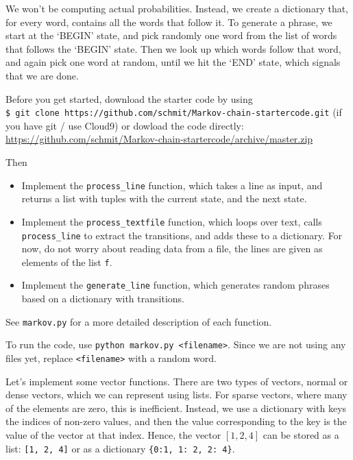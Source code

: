 \begin{questions}
We won't be computing actual probabilities.
Instead, we create a dictionary that,
for every word, contains all the words that follow it.
To generate a phrase, we start at the `BEGIN' state, and pick randomly one word
from the list of words that follows the `BEGIN' state.
Then we look up which words follow that word, and again pick one word at random, until
we hit the `END' state, which signals that we are done.

Before you get started, download the starter code by using\\
\texttt{\$ git clone https://github.com/schmit/Markov-chain-startercode.git} (if you have git / use Cloud9)
    or dowload the code directly:\\ \url{https://github.com/schmit/Markov-chain-startercode/archive/master.zip}

Then
\begin{itemize}
    \item Implement the \texttt{process\_line} function, which takes a line as input,
    and returns a list with tuples with the current state, and the next state.
    \item Implement the \texttt{process\_textfile} function, which loops over
    text, calls \texttt{process\_line} to extract the transitions, and adds these to
    a dictionary. For now, do not worry about reading data from a file, the lines
    are given as elements of the list \texttt{f}.
    \item Implement the \texttt{generate\_line} function, which generates random
    phrases based on a dictionary with transitions.
\end{itemize}
See \texttt{markov.py} for a more detailed description of each function.

To run the code, use \texttt{python markov.py <filename>}.
Since we are not using any files yet, replace \texttt{<filename>} with a random word.

\label{sub:vector_multiply}

Let's implement some vector functions.
There are two types of vectors, normal or dense vectors, which
we can represent using lists.
For sparse vectors, where many of the elements are zero,
this is inefficient.
Instead, we use a dictionary with keys the indices of non-zero values, and then the value
corresponding to the key is the value of the vector at that index.
Hence, the vector $[1, 2, 4]$ can be stored as a list: \texttt{[1, 2, 4]}
or as a dictionary \texttt{\{0:1, 1: 2, 2: 4\}}.


\end{questions}
